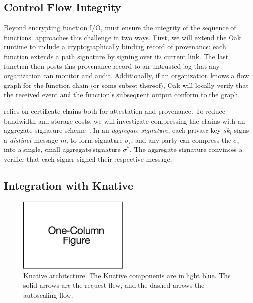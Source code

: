 \subsection{Control Flow Integrity}
%
Beyond encrypting function I/O, \SystemName must ensure the integrity
of the sequence of functions.
%
\SystemName approaches this challenge in two ways.
%
First, we will extend the Oak runtime to include a cryptographically binding record
of provenance: each function extends a path signature by signing over its
current link.
%
The last function then posts this provenance record to an untrusted log that
any organization can monitor and audit.
%
Additionally, if an organization knows a flow graph for the function chain (or
some subset thereof),  Oak will locally verify that the received event and the
function's subsequent output conform to the graph.


\SystemName relies on certificate chains both for attestation and provenance.
%
To reduce bandwidth and storage costs, we will investigate compressing the chains
with an aggregate signature
scheme~\cite{03-eurocrypt-aggregate_signatures_bilinear_maps}.
%
In an \emph{aggregate signature}, each private key $sk_i$ signs a
\emph{distinct} message $m_i$ to form signature $\sigma_i$, and any party can
compress the $\sigma_i$ into a single, small aggregate signature $\sigma^*$.  
%
The aggregate signature convinces a verifier that each signer signed their
respective message.



\subsection{Integration with Knative}

\begin{figure}
    \centering
    \includegraphics[page = 6, width=0.48\textwidth]{diagrams/slides.pdf}
    \caption{Knative architecture.
    The Knative components are in light blue.
    The solid arrows are the request flow, and the dashed arrows the
    autoscaling flow.}
    \label{fig:knative}
\end{figure}

